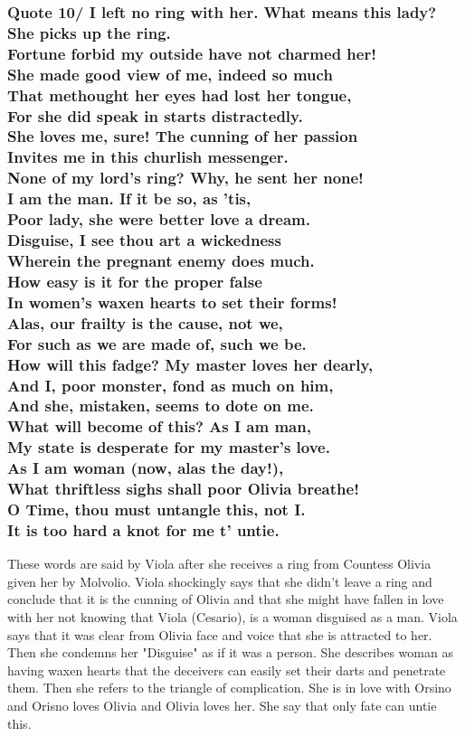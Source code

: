 \documentclass[12pt, a4paper]{article}
\begin{document}
\subsubsection*{Quote 10/
I left no ring with her. What means this lady?\\
She picks up the ring.\\
Fortune forbid my outside have not charmed her!\\
She made good view of me, indeed so much\\
That methought her eyes had lost her tongue,\\
For she did speak in starts distractedly.\\
She loves me, sure! The cunning of her passion\\
Invites me in this churlish messenger.\\
None of my lord’s ring? Why, he sent her none!\\
I am the man. If it be so, as ’tis,\\
Poor lady, she were better love a dream.\\
Disguise, I see thou art a wickedness\\
Wherein the pregnant enemy does much.\\
How easy is it for the proper false\\
In women’s waxen hearts to set their forms!\\
Alas, our frailty is the cause, not we,\\
For such as we are made of, such we be.\\
How will this fadge? My master loves her dearly,\\
And I, poor monster, fond as much on him,\\
And she, mistaken, seems to dote on me.\\
What will become of this? As I am man,\\
My state is desperate for my master’s love.\\
As I am woman (now, alas the day!),\\
What thriftless sighs shall poor Olivia breathe!\\
O Time, thou must untangle this, not I.\\
It is too hard a knot for me t’ untie.
}

These words are said by Viola after she receives a ring from Countess 
Olivia given her by Molvolio. Viola shockingly says that she didn't leave 
a ring and conclude that it is the cunning of Olivia and that she 
might have fallen in love with her not knowing that Viola (Cesario),
is a woman disguised as a man. Viola says that it was clear from Olivia 
face and voice that she is attracted to her. Then she condemns her
"Disguise" as if it was a person. She describes woman as having waxen
hearts that the deceivers can easily set their darts and penetrate them.
Then she refers to the triangle of complication. She is in love with
Orsino and Orisno loves Olivia and Olivia loves her. She say that 
only fate can untie this.
\end{document}
